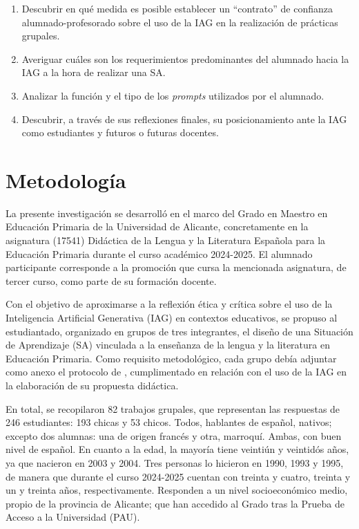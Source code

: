 \documentclass[spanish]{textolivre}
\begin{document}
\begin{enumerate}
    \item Descubrir en qué medida es posible establecer un “contrato” de confianza alumnado-profesorado sobre el uso de la IAG en la realización de prácticas grupales.
    \item Averiguar cuáles son los requerimientos predominantes del alumnado hacia la IAG a la hora de realizar una SA.
    \item Analizar la función y el tipo de los \textit{prompts} utilizados por el alumnado.
    \item Descubrir, a través de sus reflexiones finales, su posicionamiento ante la IAG como estudiantes y futuros o futuras docentes.
\end{enumerate}


\section{Metodología}\label{sec-formato}
La presente investigación se desarrolló en el marco del Grado en Maestro en Educación Primaria de la Universidad de Alicante, concretamente en la asignatura (17541) Didáctica de la Lengua y la Literatura Española para la Educación Primaria durante el curso académico 2024-2025. El alumnado participante corresponde a la promoción que cursa la mencionada asignatura, de tercer curso, como parte de su formación docente.

Con el objetivo de aproximarse a la reflexión ética y crítica sobre el uso de la Inteligencia Artificial Generativa (IAG) en contextos educativos, se propuso al estudiantado, organizado en grupos de tres integrantes, el diseño de una Situación de Aprendizaje (SA) vinculada a la enseñanza de la lengua y la literatura en Educación Primaria. Como requisito metodológico, cada grupo debía adjuntar como anexo el protocolo de \textcite{Cassany2024}, cumplimentado en relación con el uso de la IAG en la elaboración de su propuesta didáctica.

En total, se recopilaron 82 trabajos grupales, que representan las respuestas de 246 estudiantes: 193 chicas y 53 chicos. Todos, hablantes de español, nativos; excepto dos alumnas: una de origen francés y otra, marroquí. Ambas, con buen nivel de español. En cuanto a la edad, la mayoría tiene veintiún y veintidós años, ya que nacieron en 2003 y 2004. Tres personas lo hicieron en 1990, 1993 y 1995, de manera que durante el curso 2024-2025 cuentan con treinta y cuatro, treinta y un y treinta años, respectivamente. Responden a un nivel socioeconómico medio, propio de la provincia de Alicante; que han accedido al Grado tras la Prueba de Acceso a la Universidad (PAU).
\end{document}
